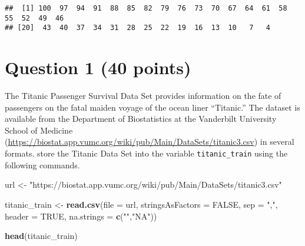 \documentclass[
]{article}
\newenvironment{Shaded}{\begin{snugshade}}{\end{snugshade}}
\newcommand{\AttributeTok}[1]{\textcolor[rgb]{0.13,0.29,0.53}{#1}}
\newcommand{\ConstantTok}[1]{\textcolor[rgb]{0.56,0.35,0.01}{#1}}
\newcommand{\FunctionTok}[1]{\textcolor[rgb]{0.13,0.29,0.53}{\textbf{#1}}}
\newcommand{\NormalTok}[1]{#1}
\newcommand{\OtherTok}[1]{\textcolor[rgb]{0.56,0.35,0.01}{#1}}
\newcommand{\StringTok}[1]{\textcolor[rgb]{0.31,0.60,0.02}{#1}}
\begin{document}
\begin{verbatim}
##  [1] 100  97  94  91  88  85  82  79  76  73  70  67  64  61  58  55  52  49  46
## [20]  43  40  37  34  31  28  25  22  19  16  13  10   7   4
\end{verbatim}

\hypertarget{question-1-40-points}{%
\section{Question 1 (40 points)}\label{question-1-40-points}}

The Titanic Passenger Survival Data Set provides information on the fate
of passengers on the fatal maiden voyage of the ocean liner ``Titanic.''
The dataset is available from the Department of Biostatistics at the
Vanderbilt University School of Medicine
(\url{https://biostat.app.vumc.org/wiki/pub/Main/DataSets/titanic3.csv})
in several formats. store the Titanic Data Set into the variable
\texttt{titanic\_train} using the following commands.

\begin{Shaded}
\begin{Highlighting}[]
\NormalTok{url }\OtherTok{\textless{}{-}} \StringTok{"https://biostat.app.vumc.org/wiki/pub/Main/DataSets/titanic3.csv"}

\NormalTok{titanic\_train }\OtherTok{\textless{}{-}} \FunctionTok{read.csv}\NormalTok{(}\AttributeTok{file =}\NormalTok{ url,}
                          \AttributeTok{stringsAsFactors =} \ConstantTok{FALSE}\NormalTok{,}
                          \AttributeTok{sep =} \StringTok{","}\NormalTok{,}
                          \AttributeTok{header =} \ConstantTok{TRUE}\NormalTok{,}
                          \AttributeTok{na.strings =} \FunctionTok{c}\NormalTok{(}\StringTok{""}\NormalTok{,}\StringTok{"NA"}\NormalTok{))}

\FunctionTok{head}\NormalTok{(titanic\_train)}
\end{Highlighting}
\end{Shaded}
\end{document}
